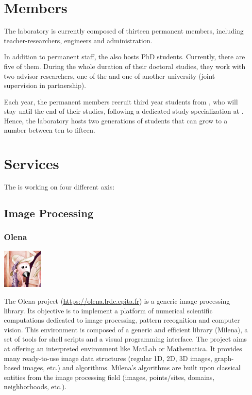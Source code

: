 \section{Members}
The laboratory is currently composed of thirteen permanent members, including teacher-researchers, engineers
and administration.

\noindent In addition to permanent staff, the \LRDE\space also hosts PhD students. Currently, there are five
of them. During the whole duration of their doctoral studies, they work with two advisor researchers, one of
the \LRDE\space and one of another university (joint supervision in partnership).

Each year, the permanent members recruit third year students from \EPITA, who will stay until the
end of their studies, following a dedicated study specialization at \EPITA\space. Hence, the laboratory
hosts two generations of students that can grow to a number between ten to fifteen.


\section{Services}
The \LRDE\space is working on four different axis:


\subsection{Image Processing}
\subsubsection{Olena}
\begin{center}
 \includegraphics[width=2cm]{img/olena.jpg}
\end{center}
The Olena project (\url{https://olena.lrde.epita.fr}) is a generic image processing library.
Its objective is to implement a platform of numerical scientific computations dedicated to image
processing, pattern recognition and computer vision. This environment is composed of a generic and
efficient library (Milena), a set of tools for shell scripts and a visual programming interface.
The project aims at offering an interpreted environment like MatLab or Mathematica. It provides many
ready-to-use image data structures (regular 1D, 2D, 3D images, graph-based images, etc.) and algorithms.
Milena's algorithms are built upon classical entities from the image processing field (images, points/sites,
domains, neighborhoods, etc.).\\

